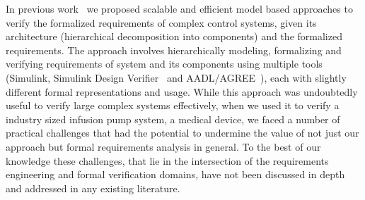 In previous work~\cite{hilt2013, req2code} we proposed scalable and efficient model based approaches to verify the formalized requirements of complex control systems, given its architecture (hierarchical decomposition into components) and the formalized requirements. The approach involves hierarchically modeling, formalizing and verifying requirements of system and its components using multiple tools (Simulink, Simulink Design Verifier~\cite{SimulinkDesignVerifier} and AADL/AGREE~\cite{NFM2012:CoGaMiWhLaLu}), each with slightly different formal representations and usage. While this approach was undoubtedly useful to verify large complex systems effectively, when we used it to verify a industry sized infusion pump system, a medical device, we faced a number of practical challenges that had the potential to undermine the value of not just our approach but formal requirements analysis in general. To the best of our knowledge these challenges, that lie in the intersection of the requirements engineering and formal verification domains, have not been discussed in depth and addressed in any existing literature.

